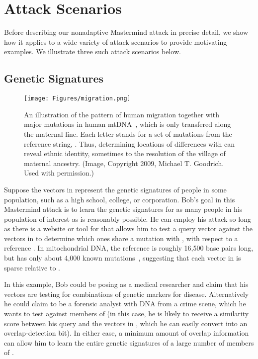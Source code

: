\documentclass{article}
\begin{document}
\section{Attack Scenarios}
Before describing our nonadaptive Mastermind attack in precise detail, 
we show how it applies to a wide variety of attack scenarios to provide
motivating examples.  We illustrate three such attack scenarios
below.

\subsection{Genetic Signatures}

\begin{figure}[]
\begin{center}
\texttt{[image: Figures/migration.png]}
\end{center}
\vspace*{-12pt}
\caption{
An illustration of
the pattern of human migration together with major mutations in
human mtDNA~\cite{ps-mdhe-05,brb-gppd-05}, which is only transfered along
the maternal line.
Each letter stands for a set of mutations from the reference
string, .
Thus, determining locations of
differences with  can reveal ethnic identity, sometimes to the
resolution of the village of maternal ancestry.
(Image, Copyright 2009, Michael T. Goodrich. Used with permission.)
}
\label{fig:mtDNA}
\end{figure}

Suppose the vectors in  represent the genetic signatures of people
in some population, such as a high school, college, or corporation.
Bob's goal in this Mastermind attack is to learn the genetic
signatures for as many people in his population of interest as
is reasonably possible.
He can employ his attack so long as there is a website or tool for
 that allows him to test a query vector  against the
vectors in  to determine which ones share a mutation with
, with respect to a reference .  In mitochondrial DNA, 
the reference  is roughly 16,500 base pairs long, 
but has only about 4,000 known mutations~\cite{brandon04,ruiz07}, 
suggesting that each vector in  is sparse relative to .

In this example, Bob could be posing as a medical researcher and claim that 
his vectors are testing for combinations of genetic markers for disease. 
Alternatively he could claim to be a forensic analyst with DNA from a 
crime scene, which he wants to test against members of  
(in this case, he is likely to receive a similarity score between his 
query  and the vectors in , which he can easily convert 
into an overlap-detection bit). In either case, a minimum amount of 
overlap information can allow him to learn the entire genetic signatures 
of a large number of members of .
\end{document}
